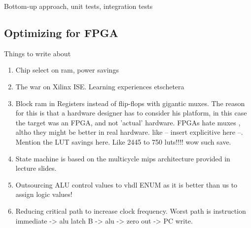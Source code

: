 Bottom-up approach, unit tests, integration tests

\subsection{Optimizing for FPGA}


Things to write about

\begin{enumerate}
  \item
    Chip select on ram, power savings

  \item
    The war on Xilinx ISE. Learning experiences etschetera

  \item
    Block ram in Registers instead of flip-flops with gigantic muxes. The reason for this is that a hardware designer has to consider his platform, in this case the target was an FPGA, and not 'actual' hardware. FPGAs hate muxes , altho they might be better in real hardware. like -- insert explicitive here --. Mention the LUT savings here. Like 2445 to 750 luts!!!! wow such save.

  \item
    State machine is based on the multicycle mips architecture provided in lecture slides.

  \item
    Outsourcing ALU control values to vhdl ENUM as it is better than us to assign logic values!

  \item
    Reducing critical path to increase clock frequency. Worst path is instruction immediate -> alu latch B -> alu -> zero out -> PC write.


\end{enumerate}

